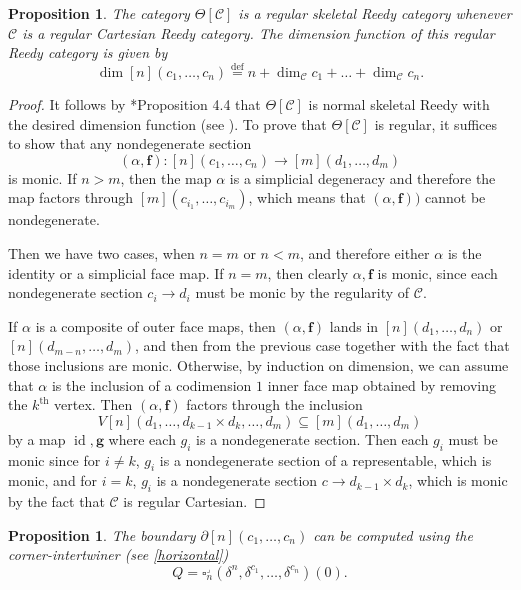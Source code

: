\documentclass[a4paper]{article}
\numberwithin{equation}{subsection}
\theoremstyle{plain}   %
\newtheorem{prop}[equation]{Proposition}
\theoremstyle{definition}
\theoremstyle{remark}
\theoremstyle{plain}
\providecommand{\C}{}
\renewcommand{\C}{\ensuremath{\mathcal{C}}}
\newcommand{\defeq}{\overset{\mathrm{def}}=}
\begin{document}
\begin{prop} 
	The category \(\Theta[\C]\) is a regular skeletal Reedy category whenever \(\C\) is a regular Cartesian Reedy category.  The dimension function of this regular Reedy category is given by 
	\[\dim[n](c_1,\dots,c_n)\defeq n+\dim_\C c_1 + \dots + \dim_\C c_n.\]
\end{prop}
\begin{proof} 
	It follows by \cite{bergner-rezk-reedy}*{Proposition 4.4} that \(\Theta[\C]\) is normal skeletal Reedy with the desired dimension function (see ). To prove that \(\Theta[\C]\) is regular, it suffices to show that any nondegenerate section 
	\[(\alpha,\mathbf{f}):[n](c_1,\dots,c_n) \to [m](d_1,\dots, d_m)\]
	is monic.  If \(n>m\), then the map \(\alpha\) is a simplicial degeneracy and therefore the map factors through \([m](c_{i_1},\dots,c_{i_m})\), which means that \((\alpha,\mathbf{f}))\) cannot be nondegenerate.  
	
	Then we have two cases, when \(n=m\) or \(n<m\), and therefore either \(\alpha\) is the identity or a simplicial face map.  If \(n=m\), then clearly \(\alpha, \mathbf{f}\) is monic, since each nondegenerate section \(c_i\to d_i\) must be monic by the regularity of \(\C\).
	
	If \(\alpha\) is a composite of outer face maps, then \((\alpha,\mathbf{f})\) lands in \([n](d_1,\dots,d_n)\) or \([n](d_{m-n},\dots, d_m)\), and then from the previous case together with the fact that those inclusions are monic.  Otherwise, by induction on dimension, we can assume that \(\alpha\) is the inclusion of a codimension \(1\) inner face map obtained by removing the \(k^\mathrm{th}\) vertex. Then \((\alpha,\mathbf{f})\) factors through the inclusion \[V[n](d_1,\dots,d_{k-1} \times d_k,\dots, d_m) \subseteq [m](d_1,\dots,d_m)\] by a map \(\operatorname{id}, \mathbf{g}\) where each \(g_i\) is a nondegenerate section.  Then each \(g_i\) must be monic since for \(i\neq k\), \(g_i\) is a nondegenerate section of a representable, which is monic, and for \(i=k\), \(g_i\) is a nondegenerate section \(c\to d_{k-1} \times d_k\), which is monic by the fact that \(\C\) is regular Cartesian.
\end{proof}
\begin{prop} The boundary \(\partial[n](c_1,\dots,c_n)\) can be computed using the corner-intertwiner (see \ref{horizontal})
	\[Q=\square^\lrcorner_n(\delta^n, \delta^{c_1}, \dots, \delta^{c_n})(0).\]
\end{prop}
\end{document}
